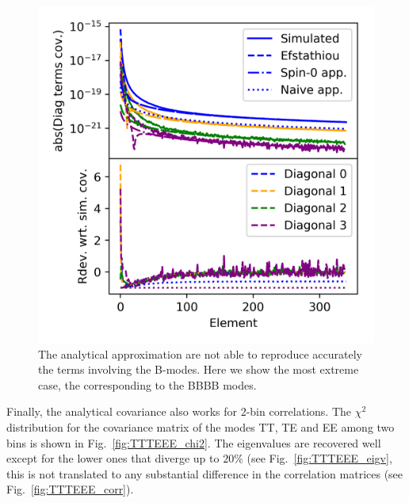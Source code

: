\documentclass[useAMS,usenatbib]{mn2e}
\begin{document}
\begin{figure} %
  \centering
  \includegraphics[width=\columnwidth]{./figures/run_sph_ALL_BBBB_check_diagonal_terms_4.png}
  \caption{The analytical approximation are not able to reproduce accurately
    the terms involving the B-modes. Here we show the most extreme case, the
    corresponding to the BBBB modes.}
  \label{fig:BBBB}
\end{figure}

Finally, the analytical covariance also works for 2-bin correlations. The
$\chi^2$ distribution for the covariance matrix of the modes TT, TE and EE
among two bins is shown in Fig.~\ref{fig:TTTEEE_chi2}. The eigenvalues
are recovered well except for the lower ones that diverge up to $20\%$ (see
Fig.~\ref{fig:TTTEEE_eigv}, this is not translated to any substantial
difference in the correlation matrices (see Fig.~\ref{fig:TTTEEE_corr}).
\end{document}
